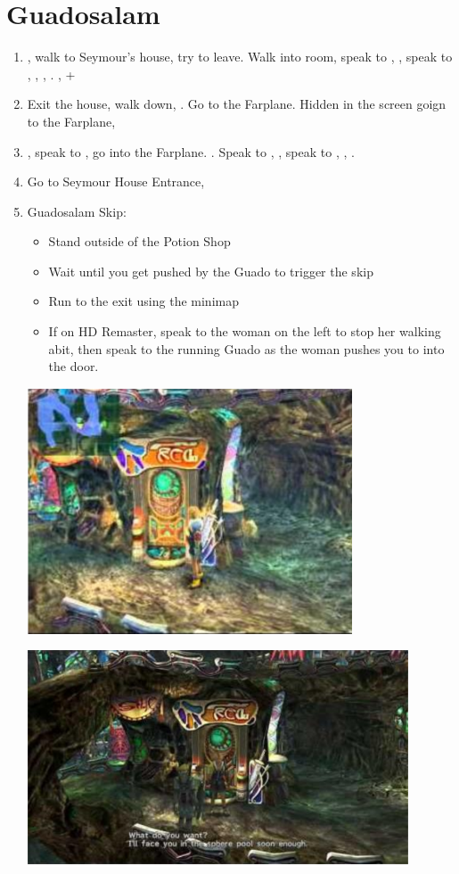 \chapter{Guadosalam}

\begin{enumerate}
	\item \sd, walk to Seymour's house, try to leave. Walk into room, speak to \auron, \sd, speak to \lulu, \wakka, \rikku, \yuna. \sd, \fmv+\cs[5:50]
	\item Exit the house, walk down, \sd. Go to the Farplane. Hidden in the screen goign to the Farplane, 
	\item \sd, speak to \auron, go into the Farplane. \cs[1:20]. Speak to \wakka, \sd, speak to \yuna, \cs[2:10], \sd.
	\item Go to Seymour House Entrance, \sd
	\item Guadosalam Skip:
	\begin{itemize}
		\item Stand outside of the Potion Shop
		\item Wait until you get pushed by the Guado to trigger the skip
		\item Run to the exit using the minimap
		\item If on HD Remaster, speak to the woman on the left to stop her walking abit, then speak to the running Guado as the woman pushes you to into the door.
	\end{itemize}
	\includegraphics{graphics/guadoskipstandard}

	\includegraphics{graphics/guadoskipremaster}
\end{enumerate}
